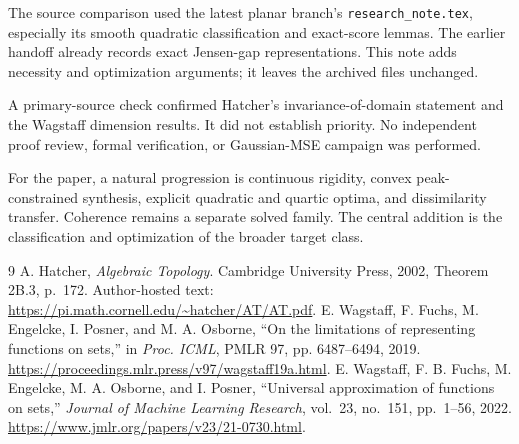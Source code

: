 \documentclass[11pt,letterpaper]{article}
\theoremstyle{remark}
\begin{document}
The source comparison used the latest planar branch's \texttt{research\_note.tex}, especially its smooth quadratic classification and exact-score lemmas. The earlier handoff already records exact Jensen-gap representations. This note adds necessity and optimization arguments; it leaves the archived files unchanged.

A primary-source check confirmed Hatcher's invariance-of-domain statement and the Wagstaff dimension results. It did not establish priority. No independent proof review, formal verification, or Gaussian-MSE campaign was performed.

For the paper, a natural progression is continuous rigidity, convex peak-constrained synthesis, explicit quadratic and quartic optima, and dissimilarity transfer. Coherence remains a separate solved family. The central addition is the classification and optimization of the broader target class.

\begin{thebibliography}{9}
 A. Hatcher, \emph{Algebraic Topology}. Cambridge University Press, 2002, Theorem 2B.3, p.~172. Author-hosted text: \url{https://pi.math.cornell.edu/~hatcher/AT/AT.pdf}.
 E. Wagstaff, F. Fuchs, M. Engelcke, I. Posner, and M. A. Osborne, ``On the limitations of representing functions on sets,'' in \emph{Proc. ICML}, PMLR 97, pp. 6487--6494, 2019. \url{https://proceedings.mlr.press/v97/wagstaff19a.html}.
 E. Wagstaff, F. B. Fuchs, M. Engelcke, M. A. Osborne, and I. Posner, ``Universal approximation of functions on sets,'' \emph{Journal of Machine Learning Research}, vol.~23, no.~151, pp.~1--56, 2022. \url{https://www.jmlr.org/papers/v23/21-0730.html}.
\end{thebibliography}
\end{document}
